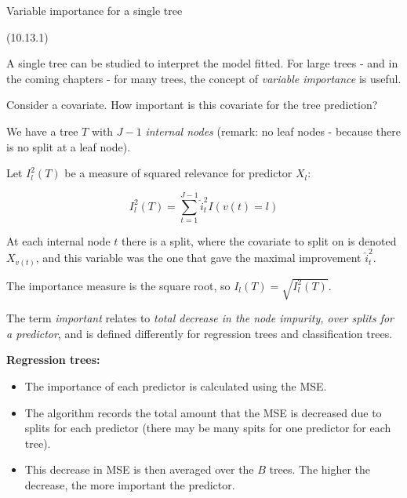 \documentclass[
  ignorenonframetext,
]{beamer}
\providecommand{\tightlist}{%
  \setlength{\itemsep}{0pt}\setlength{\parskip}{0pt}}
\begin{document}
\begin{frame}

\begin{block}{Variable importance for a single tree}

(10.13.1)

A single tree can be studied to interpret the model fitted. For large
trees - and in the coming chapters - for many trees, the concept of
\emph{variable importance} is useful.

Consider a covariate. How important is this covariate for the tree
prediction?

We have a tree \(T\) with \(J-1\) \emph{internal nodes} (remark: no leaf
nodes - because there is no split at a leaf node).

Let \(I_l^2(T)\) be a measure of squared relevance for predictor
\(X_l\):

\[ I_l^2(T)=\sum_{t=1}^{J-1} \hat{i}^2_t I(v(t)=l)\]

At each internal node \(t\) there is a split, where the covariate to
split on is denoted \(X_{v(t)}\), and this variable was the one that
gave the maximal improvement \(\hat{i}^2_t\).

The importance measure is the square root, so
\(I_l(T)= \sqrt{I_l^2(T)}\).

\end{block}

\end{frame}

\begin{frame}

The term \emph{important} relates to \emph{total decrease in the node
impurity, over splits for a predictor}, and is defined differently for
regression trees and classification trees.

\textbf{Regression trees:}

\begin{itemize}
\tightlist
\item
  The importance of each predictor is calculated using the MSE.
\item
  The algorithm records the total amount that the MSE is decreased due
  to splits for each predictor (there may be many spits for one
  predictor for each tree).
\item
  This decrease in MSE is then averaged over the \(B\) trees. The higher
  the decrease, the more important the predictor.
\end{itemize}

\end{frame}
\end{document}
